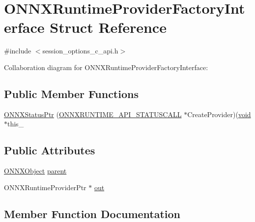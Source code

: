 \hypertarget{structONNXRuntimeProviderFactoryInterface}{}\section{O\+N\+N\+X\+Runtime\+Provider\+Factory\+Interface Struct Reference}
\label{structONNXRuntimeProviderFactoryInterface}


{\ttfamily \#include $<$session\+\_\+options\+\_\+c\+\_\+api.\+h$>$}



Collaboration diagram for O\+N\+N\+X\+Runtime\+Provider\+Factory\+Interface\+:
\subsection*{Public Member Functions}
\begin{DoxyCompactItemize}
\item 
\mbox{\hyperlink{structONNXRuntimeProviderFactoryInterface_a0e0df7f8cd4f3293853d9e799afd56b5}{O\+N\+N\+X\+Status\+Ptr}} (\mbox{\hyperlink{error__code_8h_aeaeecdc9b792735c3e26fc0f9815c988}{O\+N\+N\+X\+R\+U\+N\+T\+I\+M\+E\+\_\+\+A\+P\+I\+\_\+\+S\+T\+A\+T\+U\+S\+C\+A\+LL}} $\ast$Create\+Provider)(\mbox{\hyperlink{mlasi_8h_a88f941d423cb2a819b70a1358982b1a6}{void}} $\ast$this\+\_\+
\end{DoxyCompactItemize}
\subsection*{Public Attributes}
\begin{DoxyCompactItemize}
\item 
\mbox{\hyperlink{structONNXObject}{O\+N\+N\+X\+Object}} \mbox{\hyperlink{structONNXRuntimeProviderFactoryInterface_abd899afd61a75b368085193024136053}{parent}}
\item 
O\+N\+N\+X\+Runtime\+Provider\+Ptr $\ast$ \mbox{\hyperlink{structONNXRuntimeProviderFactoryInterface_a09496ffe23137d4dc2a2b017282b91c9}{out}}
\end{DoxyCompactItemize}


\subsection{Member Function Documentation}
\mbox{\label{structONNXRuntimeProviderFactoryInterface_a0e0df7f8cd4f3293853d9e799afd56b5}} 
